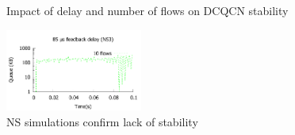 \begin{figure}
\caption{Impact of delay and number of flows on DCQCN stability}
\label{fig:dcqcn_unstable}
\end{figure}

\begin{figure}
\center
\includegraphics[width=0.4\textwidth]{figures/stable_queue_85_ns.pdf}
\caption{NS simulations confirm lack of stability}
\label{fig:dcqcn_unstable_ns}
\end{figure}

